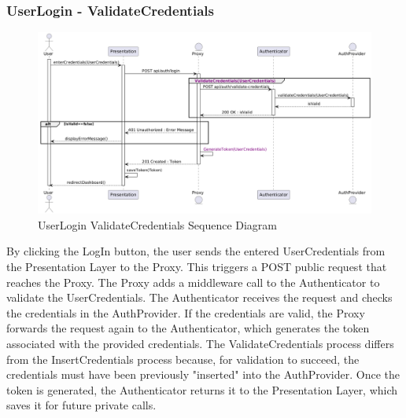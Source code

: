 \subsubsection*{UserLogin - ValidateCredentials}
\begin{figure}[H]
    \centering
    \includegraphics[width=\linewidth]{Latex/Images/DD/SequenceDiagrams/2UserLoginValidateCredentials.png}
    \caption{UserLogin ValidateCredentials Sequence Diagram}
    \label{fig:userlogin}
\end{figure}
By clicking the LogIn button, the user sends the entered UserCredentials from the Presentation Layer to the Proxy. This triggers a POST public request that reaches the Proxy. The Proxy adds a middleware call to the Authenticator to validate the UserCredentials. The Authenticator receives the request and checks the credentials in the AuthProvider. If the credentials are valid, the Proxy forwards the request again to the Authenticator, which generates the token associated with the provided credentials. The ValidateCredentials process differs from the InsertCredentials process because, for validation to succeed, the credentials must have been previously "inserted" into the AuthProvider. Once the token is generated, the Authenticator returns it to the Presentation Layer, which saves it for future private calls.

